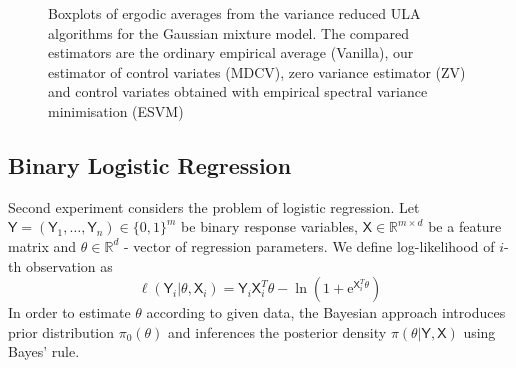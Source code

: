 \documentclass[bj]{imsart}
\def\rset{\mathbb{R}}
\def\rme{\mathrm{e}}
\def\rset{\mathbb{R}}
\begin{document}
 \begin{figure}[tbh]
\centering
{}
\qquad
{}
\caption{Boxplots of ergodic averages  from the variance reduced ULA algorithms for the Gaussian mixture model. The compared estimators are the ordinary empirical average  (Vanilla), our estimator of control variates (MDCV), zero variance estimator (ZV) and control variates obtained with empirical spectral variance minimisation (ESVM) 
\label{fig:GMM}}
\end{figure}

\subsection{Binary Logistic Regression}

Second experiment considers the problem of logistic regression. Let $\mathsf{Y} = \left(\mathsf{Y}_1,\ldots,\mathsf{Y}_n\right) \in \{0,1\}^m$ be binary response variables, $\mathsf{X} \in \rset^{m \times d}$ be a feature matrix and $\theta \in \rset^d$ - vector of regression parameters. We define log-likelihood of $i$-th observation as
\[
\ell(\mathsf{Y}_i | \theta, \mathsf{X}_i) = \mathsf{Y}_i \mathsf{X}_i^T\theta - \ln{\left(1 + \rme^{\mathsf{X}_i^T\theta}\right)}
\]
In order to estimate $\theta$ according to given data, the Bayesian approach introduces prior distribution $\pi_0(\theta)$ and inferences the posterior density $\pi(\theta| \mathsf{Y}, \mathsf{X})$ using Bayes' rule.
\end{document}
